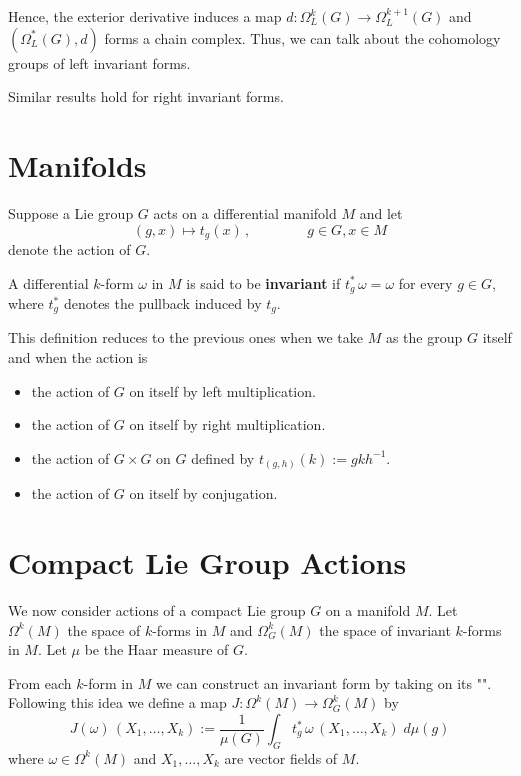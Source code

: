 \documentclass[12pt]{article}
\begin{document}
$\,$

Hence, the exterior derivative induces a map $d:\Omega^k_L(G) \longrightarrow \Omega^{k+1}_L(G)$ and $(\Omega^*_L(G), d)$ forms a chain complex. Thus, we can talk about the cohomology groups of left invariant forms.

Similar results hold for right invariant forms.

\section{Manifolds}

Suppose a Lie group $G$ acts  on a differential manifold $M$ and let
\begin{displaymath}
(g,x)\longmapsto t_g(x)\,, \qquad\qquad g \in G, x \in M
\end{displaymath}
denote the action of $G$.

A differential $k$-form $\omega$ in $M$ is said to be {\bf invariant} if $t_g^*\,\omega = \omega$ for every $g \in G$, where $t_g^*$ denotes the pullback induced by $t_g$.

This definition reduces to the previous ones when we take $M$ as the group $G$ itself and when the action is
\begin{itemize}
\item the action of $G$ on itself by left multiplication.
\item the action of $G$ on itself by right multiplication.
\item the action of $G\times G$ on $G$ defined by $t_{(g,h)}(k):=gkh^{-1}$.
\item the action of $G$ on itself by conjugation.
\end{itemize}

\section{Compact Lie Group Actions}

We now consider actions of a compact Lie group $G$ on a manifold $M$. Let $\Omega^k(M)$ the space of $k$-forms in $M$ and $\Omega_G^k(M)$ the space of invariant $k$-forms in $M$. Let $\mu$ be the Haar measure of $G$.

From each $k$-form in $M$ we can construct an invariant form by taking  on its "". Following this idea we define a map $J: \Omega^k(M) \longrightarrow \Omega_G^k(M)$ by
\begin{displaymath}
J(\omega)\,(X_1, \dots, X_k) := \frac{1}{\mu(G)} \int_G t_g^*\,\omega\,(X_1,\dots,X_k)\;d\mu(g)
\end{displaymath}
where $\omega \in \Omega^k(M)$ and $X_1, \dots, X_k$ are vector fields of $M$.
\end{document}
